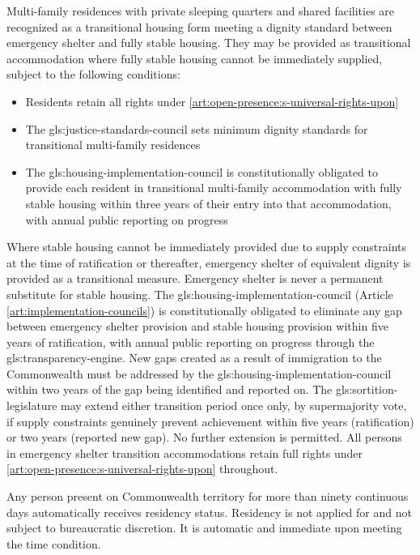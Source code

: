 Multi-family residences with private sleeping quarters and shared facilities are recognized as a transitional housing form meeting a dignity standard between emergency shelter and fully stable housing. They may be provided as transitional accommodation where fully stable housing cannot be immediately supplied, subject to the following conditions:
\begin{itemize}
  \item Residents retain all rights under \ref{art:open-presence:s-universal-rights-upon}
  \item The \gls{gls:justice-standards-council} sets minimum dignity standards for transitional multi-family residences
  \item The \gls{gls:housing-implementation-council} is constitutionally obligated to provide each resident in transitional multi-family accommodation with fully stable housing within three years of their entry into that accommodation, with annual public reporting on progress
\end{itemize}

Where stable housing cannot be immediately provided due to supply constraints at the time of ratification or thereafter, emergency shelter of equivalent dignity is provided as a transitional measure. Emergency shelter is never a permanent substitute for stable housing. The \gls{gls:housing-implementation-council} (Article \ref{art:implementation-councils}) is constitutionally obligated to eliminate any gap between emergency shelter provision and stable housing provision within five years of ratification, with annual public reporting on progress through the \gls{gls:transparency-engine}. New gaps created as a result of immigration to the Commonwealth must be addressed by the \gls{gls:housing-implementation-council} within two years of the gap being identified and reported on. The \gls{gls:sortition-legislature} may extend either transition period once only, by supermajority vote, if supply constraints genuinely prevent achievement within five years (ratification) or two years (reported new gap). No further extension is permitted. All persons in emergency shelter transition accommodations retain full rights under \ref{art:open-presence:s-universal-rights-upon} throughout.


Any person present on Commonwealth territory for more than ninety continuous days automatically receives residency status. Residency is not applied for and not subject to bureaucratic discretion. It is automatic and immediate upon meeting the time condition.

